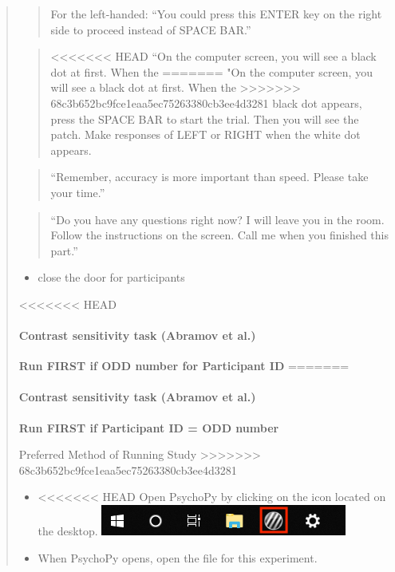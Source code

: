 \documentclass[]{article}
\providecommand{\tightlist}{%
  \setlength{\itemsep}{0pt}\setlength{\parskip}{0pt}}
\let\oldparagraph\paragraph
\renewcommand{\paragraph}[1]{\oldparagraph{#1}\mbox{}}
\begin{document}
\begin{quote}
\begin{quote}
For the left-handed: ``You could press this ENTER key on the right side
to proceed instead of SPACE BAR.''
\end{quote}

\begin{quote}
<<<<<<< HEAD
``On the computer screen, you will see a black dot at first. When the
=======
"On the computer screen, you will see a black dot at first. When the
>>>>>>> 68c3b652bc9fce1eaa5ec75263380cb3ee4d3281
black dot appears, press the SPACE BAR to start the trial. Then you will
see the patch. Make responses of LEFT or RIGHT when the white dot
appears.
\end{quote}

\begin{quote}
``Remember, accuracy is more important than speed. Please take your
time.''
\end{quote}

\begin{quote}
``Do you have any questions right now? I will leave you in the room.
Follow the instructions on the screen. Call me when you finished this
part.''
\end{quote}

\begin{itemize}
\tightlist
\item
  close the door for participants
\end{itemize}

<<<<<<< HEAD
\paragraph{Contrast sensitivity task (Abramov et
al.)}\label{contrast-sensitivity-task-abramov-et-al.}

\textbf{Run FIRST if ODD number for Participant ID}
=======
\hypertarget{contrast-sensitivity-task-abramov-et-al.}{%
\paragraph{Contrast sensitivity task (Abramov et
al.)}\label{contrast-sensitivity-task-abramov-et-al.}}

\textbf{Run FIRST if Participant ID = ODD number}

Preferred Method of Running Study
>>>>>>> 68c3b652bc9fce1eaa5ec75263380cb3ee4d3281

\begin{itemize}
\tightlist
\item
<<<<<<< HEAD
  Open PsychoPy by clicking on the icon located on the desktop.
  \includegraphics{images/PsychoPy-1.PNG}\\
\item
  When PsychoPy opens, open the file for this experiment.


\end{itemize}
\end{quote}
\end{document}

